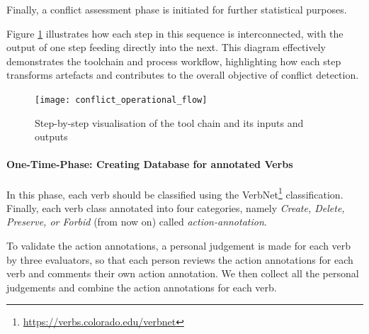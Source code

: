 Finally, a conflict assessment phase is initiated for further statistical purposes.

Figure \ref{fig:conflict_operational_flow} illustrates how each step in this sequence is interconnected, with the output of one step feeding directly into the next. This diagram effectively demonstrates the toolchain and process workflow, highlighting how each step transforms artefacts and contributes to the overall objective of conflict detection.
\begin{figure}[h]
	\centering 
	\texttt{[image: conflict\_operational\_flow]}
	\caption{Step-by-step visualisation of the tool chain and its inputs and outputs}\label{fig:conflict_operational_flow}
\end{figure}
\paragraph{One-Time-Phase: Creating Database for annotated Verbs}In this phase, each verb should be classified using the VerbNet\footnote{\href{https://verbs.colorado.edu/verbnet}{https://verbs.colorado.edu/verbnet}} classification. Finally, each verb class annotated into four categories, namely \textit{Create, Delete, Preserve, or Forbid} (from now on) called \textit{action-annotation}. 

To validate the action annotations, a personal judgement is made for each verb by three evaluators, so that each person reviews the action annotations for each verb and comments their own action annotation. We then collect all the personal judgements and combine the action annotations for each verb.


